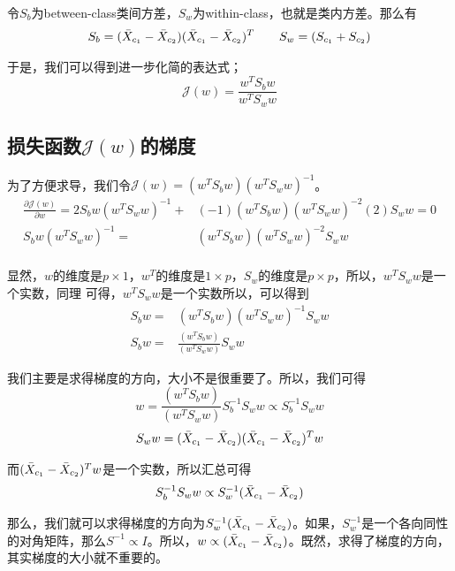\documentclass[a4paper]{article}
\begin{document}
令$S_b$为between-class类间方差，$S_w$为within-class，也就是类内方差。那么有
\begin{equation}
    S_b = (\Bar{X}_{c_1} - \Bar{X}_{c_2})(\Bar{X}_{c_1} - \Bar{X}_{c_2})^T \qquad S_w = (S_{c_1}+S_{c_2}) 
\end{equation}

于是，我们可以得到进一步化简的表达式；
\begin{equation}
    \mathcal{J}(w)=\frac{w^TS_bw}{w^TS_ww}
\end{equation}

\subsection{损失函数$\mathcal{J}(w)$的梯度}
为了方便求导，我们令$\mathcal{J}(w)=(w^TS_bw)(w^TS_ww)^{-1}$。
\begin{equation}
    \begin{split}
        \frac{\partial \mathcal{J}(w)}{\partial w} = 2S_bw(w^TS_ww)^{-1} + & (-1)(w^TS_bw)(w^TS_ww)^{-2}(2)S_ww = 0 \\
        S_bw(w^TS_ww)^{-1} = & (w^TS_bw)(w^TS_ww)^{-2}S_ww\\
    \end{split}
\end{equation}

显然，$w$的维度是$p\times 1$，$w^T$的维度是$1 \times p$，$S_w$的维度是$p\times p$，所以，$w^TS_ww$是一个实数，同理 可得，$w^TS_ww$是一个实数所以，可以得到
\begin{equation}
    \begin{split}
        S_bw = & (w^TS_bw)(w^TS_ww)^{-1}S_ww \\
        S_bw = & \frac{(w^TS_bw)}{(w^TS_ww)}S_ww
    \end{split}
\end{equation}

我们主要是求得梯度的方向，大小不是很重要了。所以，我们可得
\begin{equation}
    w = \frac{(w^TS_bw)}{(w^TS_ww)}S_b^{-1}S_ww \propto S_b^{-1}S_ww
\end{equation}
\begin{equation}
    S_ww =  (\Bar{X}_{c_1} - \Bar{X}_{c_2})(\Bar{X}_{c_1} - \Bar{X}_{c_2})^Tw
\end{equation}

而$(\Bar{X}_{c_1} - \Bar{X}_{c_2})^Tw$是一个实数，所以汇总可得
\begin{equation}
    S_b^{-1}S_ww \propto S_w^{-1}(\Bar{X}_{c_1} - \Bar{X}_{c_2})
\end{equation}

那么，我们就可以求得梯度的方向为$S_w^{-1}(\Bar{X}_{c_1} - \Bar{X}_{c_2})$。如果，$S_w^{-1}$是一个各向同性的对角矩阵，那么$S^{-1}\propto I$。所以，$w\propto (\Bar{X}_{c_1} - \Bar{X}_{c_2})$。既然，求得了梯度的方向，其实梯度的大小就不重要的。
\end{document}
